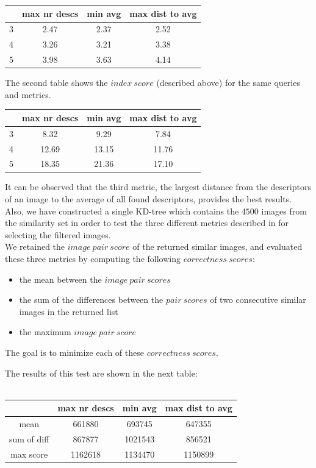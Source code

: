 \documentclass[conference]{IEEEtran}
\begin{document}
\begin{tabular} {c | c | c | c}
	& max nr descs & min avg & max dist to avg \\
	\hline
	3 & 2.47 & 2.37 & 2.52 \\
	\hline
	4 & 3.26 & 3.21 & 3.38 \\
	\hline
	5 & 3.98 & 3.63 & 4.14 \\
\end{tabular}

The second table shows the $index\ score$ (described above) for the same queries and metrics.\\

\begin{tabular} {c | c | c | c}
	& max nr descs & min avg & max dist to avg \\
	\hline
	3 & 8.32 & 9.29 & 7.84 \\
	\hline
	4 & 12.69 & 13.15 & 11.76 \\
	\hline
	5 & 18.35 & 21.36 & 17.10 \\
\end{tabular}

It can be observed that the third metric, the largest distance from the descriptors of an image to the average of all found descriptors, provides the best results.\\

Also, we have constructed a single KD-tree which contains the $4500$ images from the similarity set in order to test the three different metrics described in  for selecting the filtered images.\\
We retained the $image\ pair\ score$ of the returned similar images, and evaluated these three metrics by computing the following $correctness\ scores$:
\begin{itemize}
	\item the mean between the $image\ pair\ scores$
	\item the sum of the differences between the $pair\ scores$ of two consecutive similar images in the returned list
	\item the maximum $image\ pair\ score$
\end{itemize}
The goal is to minimize each of these $correctness\ scores$.

The results of this test are shown in the next table:\\
\\
\begin{tabular} {c | c | c | c}
	& max nr descs & min avg & max dist to avg \\
	\hline
	mean & 661880 & 693745 & 647355 \\
	\hline
	sum of diff & 867877 & 1021543 & 856521 \\
	\hline
	max score & 1162618 & 1134470 & 1150899 \\
\end{tabular}
\end{document}
